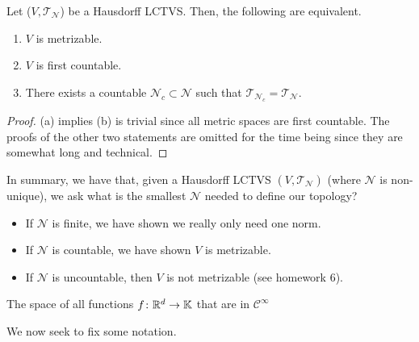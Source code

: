 \documentclass[11pt,leqno,oneside]{amsbook}
\numberwithin{thm}{section}
\newcommand{\Top}{\mathcal{T}} %
\newcommand{\cN}{\mathcal{N}}
\newcommand{\norms}{\cN}
\begin{document}
\begin{prop}
  Let (\(V,\Top_\norms\)) be a Hausdorff LCTVS. Then, the following
  are equivalent.
  \begin{enumerate}
  \item \(V\) is metrizable.
  \item \(V\) is first countable.
  \item There exists a countable \(\norms_c \subset \norms\) such that
  \(\Top_{\norms_c} = \Top_\norms\).
  \end{enumerate}
\end{prop}
\begin{proof}
  (a) implies (b) is trivial since all metric spaces are first
  countable. The proofs of the other two statements are omitted for
  the time being since they are somewhat long and technical.
\end{proof}
\begin{rmk}
  In summary, we have that, given a Hausdorff LCTVS
  \((V,\Top_\norms)\) (where \(\norms\) is non-unique), we ask what is
  the smallest \(\norms\) needed to define our topology?
  \begin{itemize}
  \item If \(\norms\) is finite, we have shown we really only need one
    norm.
  \item If \(\norms\) is countable, we have shown \(V\) is metrizable.
  \item If \(\norms\) is uncountable, then \(V\) is not metrizable
    (see homework 6).
  \end{itemize}
\end{rmk}
\begin{example}
  The space of all functions \(f \colon {\mathbb R}^d \to \mathbb{K}\) that are
  in \(\mathcal{C}^\infty\)
\end{example}
We now seek to fix some notation.
\end{document}
